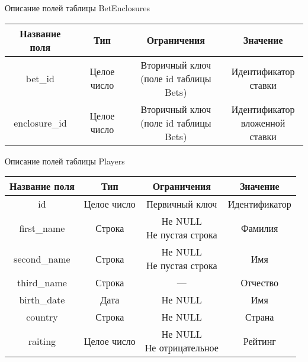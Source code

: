 \begin{center}
	\begin{threeparttable}
		\captionsetup{justification=raggedright,singlelinecheck=off}
		\caption{\label{betenclosures_table}Описание полей таблицы BetEnclosures}
		\centering
		\begin{tabular}{|c|c|c|c|}
			\hline
			Название поля & Тип & Ограничения & Значение \\
			\hline
			bet\_id & Целое число & \specialcell{Вторичный ключ\\(поле id таблицы Bets)} & \specialcell{Идентификатор\\ставки} \\
			\hline
			enclosure\_id & Целое число & \specialcell{Вторичный ключ\\(поле id таблицы Bets)} & \specialcell{Идентификатор\\вложенной ставки} \\
			\hline
		\end{tabular}
	\end{threeparttable}
\end{center}
\begin{center}
	\begin{threeparttable}
		\captionsetup{justification=raggedright,singlelinecheck=off}
		\caption{\label{players_table}Описание полей таблицы Players}
		\centering
		\begin{tabular}{|c|c|c|c|}
			\hline
			Название поля & Тип & Ограничения & Значение \\
			\hline
			id & Целое число & Первичный ключ & Идентификатор \\
			\hline
			first\_name & Строка & \specialcell{Не NULL\\Не пустая строка} & Фамилия \\
			\hline
			second\_name & Строка & \specialcell{Не NULL\\Не пустая строка} & Имя \\
			\hline
			third\_name & Строка & --- & Отчество \\
			\hline
			birth\_date & Дата & Не NULL & Имя \\
			\hline
			country & Строка & Не NULL & Страна \\
			\hline
			raiting & Целое число & \specialcell{Не NULL\\Не отрицательное} & Рейтинг\\
			\hline
		\end{tabular}
	\end{threeparttable}
\end{center}
